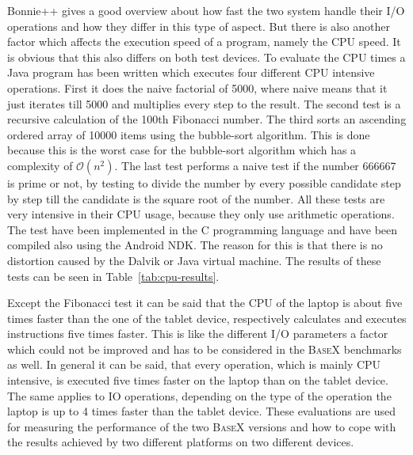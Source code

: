 Bonnie++ gives a good overview about how fast the two system handle their I/O operations and how they differ in this type of aspect.
But there is also another factor which affects the execution speed of a program, namely the CPU speed.
It is obvious that this also differs on both test devices.
To evaluate the CPU times a Java program has been written which executes four different CPU intensive operations.
First it does the naive factorial of 5000, where naive means that it just iterates till 5000 and multiplies every step to the result.
The second test is a recursive calculation of the 100th Fibonacci number.
The third sorts an ascending ordered array of 10000 items using the bubble-sort algorithm.
This is done because this is the worst case for the bubble-sort algorithm which has a complexity of $\mathcal O(n^2)$.
The last test performs a naive test if the number 666667 is prime or not, by testing to divide the number by every possible candidate step by step till the candidate is the square root of the number.
All these tests are very intensive in their CPU usage, because they only use arithmetic operations.
The test have been implemented in the C programming language and have been compiled also using the Android NDK.
The reason for this is that there is no distortion caused by the Dalvik or Java virtual machine.
The results of these tests can be seen in Table~\ref{tab:cpu-results}.

Except the Fibonacci test it can be said that the CPU of the laptop is about five times faster than the one of the tablet device, respectively calculates and executes instructions five times faster.
This is like the different I/O parameters a factor which could not be improved and has to be considered in the \textsc{BaseX} benchmarks as well.
In general it can be said, that every operation, which is mainly CPU intensive, is executed five times faster on the laptop than on the tablet device.
The same applies to IO operations, depending on the type of the operation the laptop is up to  4 times faster than the tablet device.
These evaluations are used for measuring the performance of the two \textsc{BaseX} versions and how to cope with the results achieved by two different platforms on two different devices.


